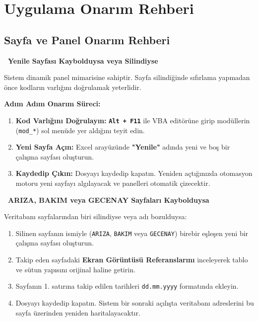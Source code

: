 \chapter{Uygulama Onarım Rehberi}

\section{Sayfa ve Panel Onarım Rehberi}

\begin{warningbox}
\textbf{\faExclamationTriangle\ Yenile Sayfası Kaybolduysa veya Silindiyse}

\vspace{0.2cm}
Sistem dinamik panel mimarisine sahiptir. Sayfa silindiğinde sıfırlama yapmadan önce kodların varlığını doğrulamak yeterlidir.

\textbf{Adım Adım Onarım Süreci:}
\begin{enumerate}\setlength{\itemsep}{1pt}
    \item \textbf{Kod Varlığını Doğrulayın:} \textbf{\texttt{Alt + F11}} ile VBA editörüne girip modüllerin (\texttt{mod\_*}) sol menüde yer aldığını teyit edin.
    \item \textbf{Yeni Sayfa Açın:} Excel arayüzünde \textbf{"Yenile"} adında yeni ve boş bir çalışma sayfası oluşturun.
    \item \textbf{Kaydedip Çıkın:} Dosyayı kaydedip kapatın. Yeniden açtığınızda otomasyon motoru yeni sayfayı algılayacak ve panelleri otomatik çizecektir.
\end{enumerate}
\end{warningbox}

\begin{infobox}
\textbf{\faDatabase\ ARIZA, BAKIM veya GECENAY Sayfaları Kaybolduysa}

\vspace{0.2cm}
Veritabanı sayfalarından biri silindiyse veya adı bozulduysa:
\begin{enumerate}\setlength{\itemsep}{1pt}
    \item Silinen sayfanın ismiyle (\texttt{ARIZA}, \texttt{BAKIM} veya \texttt{GECENAY}) birebir eşleşen yeni bir çalışma sayfası oluşturun.
    \item Takip eden sayfadaki \textbf{Ekran Görüntüsü Referanslarını} inceleyerek tablo ve sütun yapısını orijinal haline getirin.
    \item Sayfanın 1. satırına takip edilen tarihleri \texttt{dd.mm.yyyy} formatında ekleyin.
    \item Dosyayı kaydedip kapatın. Sistem bir sonraki açılışta veritabanı adreslerini bu sayfa üzerinden yeniden haritalayacaktır.
\end{enumerate}
\end{infobox}

